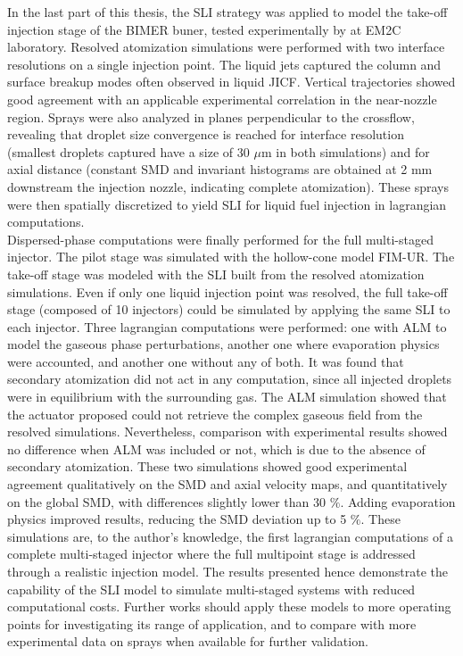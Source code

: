 In the last part of this thesis, the SLI strategy was applied to model the take-off injection stage of the BIMER buner, tested experimentally by  at EM2C laboratory. Resolved atomization simulations were performed with two interface resolutions on a single injection point. The liquid jets captured the column and surface breakup modes often observed in liquid JICF. Vertical trajectories showed good agreement with an applicable experimental correlation in the near-nozzle region. Sprays were also analyzed in planes perpendicular to the crossflow, revealing that droplet size convergence is reached for interface resolution (smallest droplets captured have a size of 30 $\mu$m in both simulations) and for axial distance (constant SMD and invariant histograms are obtained at 2 mm downstream the injection nozzle, indicating complete atomization). These sprays were then spatially discretized to yield SLI for liquid fuel injection in lagrangian computations. \\

Dispersed-phase computations were finally performed for the full multi-staged injector. The pilot stage was simulated with the hollow-cone model FIM-UR. The take-off stage was modeled with the SLI built from the resolved atomization simulations. Even if only one liquid injection point was resolved, the full take-off stage (composed of 10 injectors) could be simulated by applying the same SLI to each injector. Three lagrangian computations were performed: one with ALM to model the gaseous phase perturbations, another one where evaporation physics were accounted, and another one without any of both. It was found that secondary atomization did not act in any computation, since all injected droplets were in equilibrium with the surrounding gas. The ALM simulation showed that the actuator proposed could not retrieve the complex gaseous field from the resolved simulations. Nevertheless, comparison with experimental results showed no difference when ALM was included or not, which is due to the absence of secondary atomization. These two simulations showed good experimental agreement qualitatively on the SMD and axial velocity maps, and quantitatively on the global SMD, with differences slightly lower than 30 $\%$. Adding evaporation physics improved results, reducing the SMD deviation up to 5 $\%$. These simulations are, to the author's knowledge, the first lagrangian computations of a complete multi-staged injector where the full multipoint stage is addressed through a realistic 
injection model. The results presented hence demonstrate the capability of the SLI model to simulate multi-staged systems with reduced computational costs. Further works should apply these models to more operating points for investigating its range of application, and to compare with more experimental data on sprays when available for further validation.

